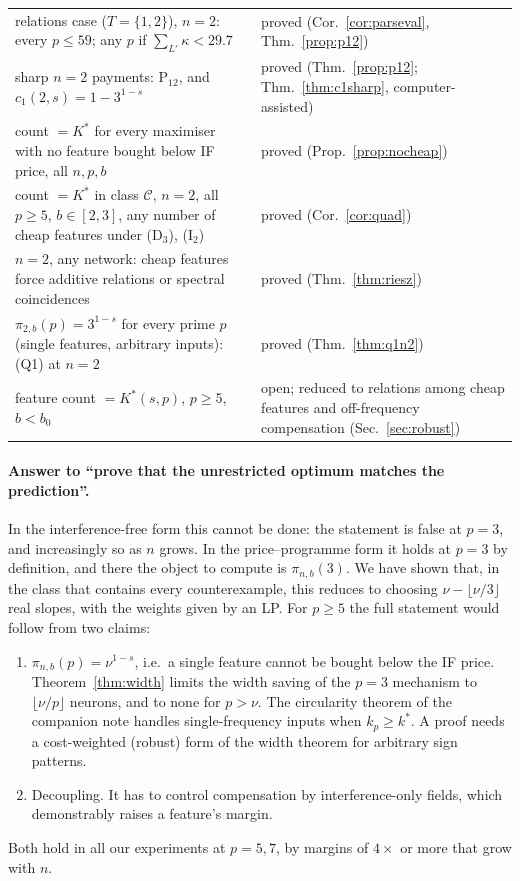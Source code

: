 \documentclass[11pt]{article}
\theoremstyle{definition}
\begin{document}
\begin{center}
\begin{tabular}{p{}p{}}
relations case ($T=\{1,2\}$), $n=2$: every $p\le59$; any $p$ if $\sum_{L'}\kappa<29.7$ & proved (Cor.~\ref{cor:parseval}, Thm.~\ref{prop:p12})\\
sharp $n=2$ payments: P$_{12}$, and $c_1(2,s)=1-3^{1-s}$ & proved (Thm.~\ref{prop:p12}; Thm.~\ref{thm:c1sharp}, computer-assisted)\\
count $=K^*$ for every maximiser with no feature bought below IF price, all $n,p,b$ & proved (Prop.~\ref{prop:nocheap})\\
count $=K^*$ in class $\mathcal C$, $n=2$, all $p\ge5$, $b\in[2,3]$, any number of cheap features under (D$_3$), (I$_2$) & proved (Cor.~\ref{cor:quad})\\
$n=2$, any network: cheap features force additive relations or spectral coincidences & proved (Thm.~\ref{thm:riesz})\\
$\pi_{2,b}(p)=3^{1-s}$ for every prime $p$ (single features, arbitrary inputs): (Q1) at $n=2$ & proved (Thm.~\ref{thm:q1n2})\\
feature count $=K^*(s,p)$, $p\ge5$, $b<b_0$ & open; reduced to relations among cheap features and off-frequency compensation (Sec.~\ref{sec:robust})\\
\bottomrule
\end{tabular}
\end{center}

\paragraph{Answer to ``prove that the unrestricted optimum matches the prediction''.}  In the interference-free form this
cannot be done: the statement is false at $p=3$, and increasingly so as $n$ grows.  In the price--programme form it holds at
$p=3$ by definition, and there the object to compute is $\pi_{n,b}(3)$.  We have shown that, in the class that contains every
counterexample, this reduces to choosing $\nu-\lfloor\nu/3\rfloor$ real slopes, with the weights given by an LP.  For
$p\ge5$ the full statement would follow from two claims:
\begin{enumerate}
\item[(Q1)] $\pi_{n,b}(p)=\nu^{1-s}$, i.e.\ a single feature cannot be bought below the IF price.  Theorem~\ref{thm:width}
limits the width saving of the $p=3$ mechanism to $\lfloor\nu/p\rfloor$ neurons, and to none for $p>\nu$.  The circularity
theorem of the companion note handles single-frequency inputs when $k_p\ge k^*$.  A proof needs a cost-weighted (robust)
form of the width theorem for arbitrary sign patterns.
\item[(Q2)] Decoupling.  It has to control compensation by interference-only fields, which demonstrably raises a feature's
margin.
\end{enumerate}
Both hold in all our experiments at $p=5,7$, by margins of $4\times$ or more that grow with $n$.
\end{document}
